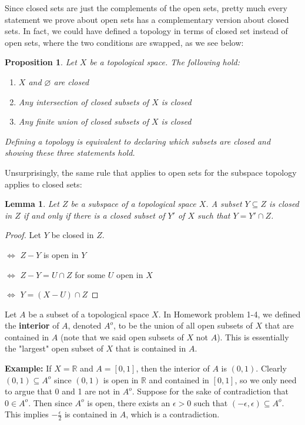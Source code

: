 \documentclass[a4paper]{article}
\newtheorem{prop}[theorem]{Proposition}
\newtheorem{lemma}[theorem]{Lemma}
\numberwithin{theorem}{section}
\begin{document}
Since closed sets are just the complements of the open sets, pretty much every statement we prove about open sets has a complementary version about closed sets. In fact, we could have defined a topology in terms of closed set instead of open sets, where the two conditions are swapped, as we see below:

\begin{prop}
Let $X$ be a topological space. The following hold:
\begin{enumerate}
    \item $X$ and $\varnothing$ are closed 
    \item Any intersection of closed subsets of $X$ is closed 
    \item Any finite union of closed subsets of $X$ is closed
\end{enumerate}
Defining a topology is equivalent to declaring which subsets are closed and showing these three statements hold.

\end{prop}

Unsurprisingly, the same rule that applies to open sets for the subspace topology applies to closed sets:

\begin{lemma}
Let $Z$ be a subspace of a topological space $X$. A subset $Y \subseteq Z$ is closed in $Z$ if and only if there is a closed subset of $Y'$ of $X$ such that $Y = Y' \cap Z$.
\end{lemma}

\begin{proof}
Let $Y$ be closed in $Z$. 

$\Leftrightarrow$ $Z-Y$ is open in $Y$

$\Leftrightarrow$ $Z-Y = U \cap Z$ for some $U$ open in $X$

$\Leftrightarrow$ $Y = (X-U) \cap Z$

\end{proof}

Let $A$ be a subset of a topological space $X$. In Homework problem 1-4, we defined the \textbf{interior} of $A$, denoted $A^o$, to be the union of all open subsets of $X$ that are contained in $A$ (note that we said open subsets of $X$ not $A$). This is essentially the "largest" open subset of $X$ that is contained in $A$.

\textbf{Example:} If $X = \mathbb{R}$ and $A = [0,1]$, then the interior of $A$ is $(0,1)$. Clearly $(0,1) \subseteq A^o$ since $(0,1)$ is open in $\mathbb{R}$ and contained in $[0,1]$, so we only need to argue that 0 and 1 are not in $A^o$. Suppose for the sake of contradiction that $0 \in A^o$. Then since $A^o$ is open, there exists an $\epsilon > 0$ such that $(-\epsilon,\epsilon) \subseteq A^o$. This implies $-\frac{\epsilon}{2}$ is contained in $A$, which is a contradiction.
\end{document}
